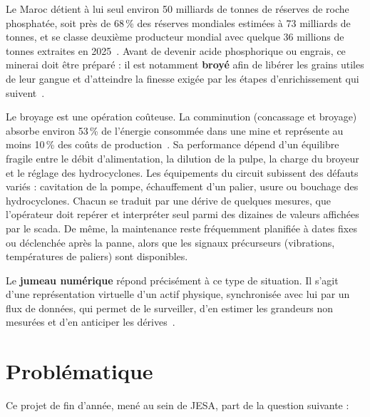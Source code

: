 
Le Maroc détient à lui seul environ 50 milliards de tonnes de réserves de roche phosphatée, soit près de 68\,\% des réserves mondiales estimées à 73 milliards de tonnes, et se classe deuxième producteur mondial avec quelque 36 millions de tonnes extraites en 2025~\cite{usgs2026}. Avant de devenir acide phosphorique ou engrais, ce minerai doit être préparé : il est notamment \textbf{broyé} afin de libérer les grains utiles de leur gangue et d'atteindre la finesse exigée par les étapes d'enrichissement qui suivent~\cite{wills2016}.

Le broyage est une opération coûteuse. La comminution (concassage et broyage) absorbe environ 53\,\% de l'énergie consommée dans une mine et représente au moins 10\,\% des coûts de production~\cite{jeswiet2016}. Sa performance dépend d'un équilibre fragile entre le débit d'alimentation, la dilution de la pulpe, la charge du broyeur et le réglage des hydrocyclones. Les équipements du circuit subissent des défauts variés : cavitation de la pompe, échauffement d'un palier, usure ou bouchage des hydrocyclones. Chacun se traduit par une dérive de quelques mesures, que l'opérateur doit repérer et interpréter seul parmi des dizaines de valeurs affichées par le \gls{scada}. De même, la maintenance reste fréquemment planifiée à dates fixes ou déclenchée après la panne, alors que les signaux précurseurs (vibrations, températures de paliers) sont disponibles.

Le \textbf{jumeau numérique} répond précisément à ce type de situation. Il s'agit d'une représentation virtuelle d'un actif physique, synchronisée avec lui par un flux de données, qui permet de le surveiller, d'en estimer les grandeurs non mesurées et d'en anticiper les dérives~\cite{grieves2017,tao2019}.

\section*{Problématique}
Ce projet de fin d'année, mené au sein de JESA, part de la question suivante :

\begin{center}
\end{center}

